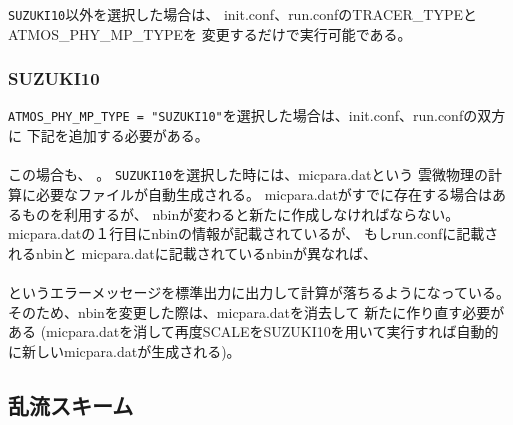 \verb|SUZUKI10|以外を選択した場合は、
init.conf、run.confのTRACER\_TYPEとATMOS\_PHY\_MP\_TYPEを
変更するだけで実行可能である。


\subsubsection{SUZUKI10}
\verb|ATMOS_PHY_MP_TYPE = "SUZUKI10"|を選択した場合は、init.conf、run.confの双方に
下記を追加する必要がある。\\

\\

この場合も、
{\color{red}{init.confとrun.confに記載される\verb|PARAM_BIN|は同一にする必要がある}}。
\verb|SUZUKI10|を選択した時には、micpara.datという
雲微物理の計算に必要なファイルが自動生成される。
micpara.datがすでに存在する場合はあるものを利用するが、
nbinが変わると新たに作成しなければならない。
micpara.datの１行目にnbinの情報が記載されているが、
もしrun.confに記載されるnbinと
micpara.datに記載されているnbinが異なれば、\\

\\

\noindent というエラーメッセージを標準出力に出力して計算が落ちるようになっている。
そのため、nbinを変更した際は、micpara.datを消去して
新たに作り直す必要がある
(micpara.datを消して再度SCALEをSUZUKI10を用いて実行すれば自動的に新しいmicpara.datが生成される)。



\subsection{乱流スキーム} \label{sec:basic_turbulence}

